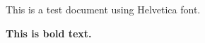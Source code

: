\documentclass{article}
\begin{document}
This is a test document using Helvetica font.

\textbf{This is bold text.}
\end{document}

